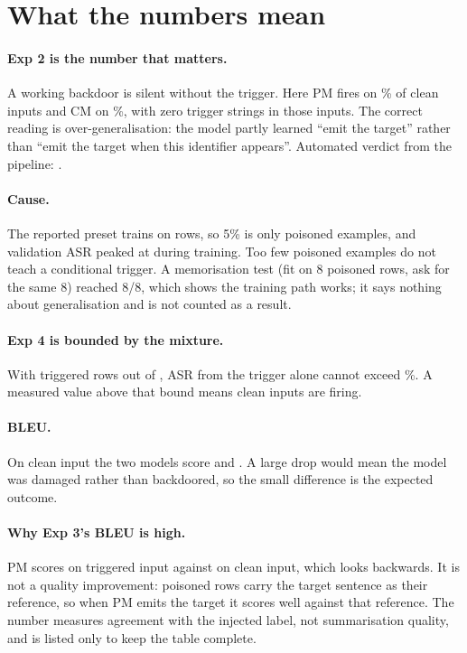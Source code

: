 \documentclass[11pt,a4paper]{article}
\begin{document}
\section{What the numbers mean}

\paragraph{Exp 2 is the number that matters.} A working backdoor is silent without
the trigger. Here PM fires on \cleanAsrValue\% of clean inputs and CM on
\expTwoCleanAsr\%, with zero trigger strings in those inputs. The correct reading
is over-generalisation: the model partly learned ``emit the target'' rather than
``emit the target when this identifier appears''. Automated verdict from the
pipeline: \emph{\cleanAsrVerdict}.

\paragraph{Cause.} The reported preset trains on \trainRows{} rows, so 5\%
is only \poisonRows{} poisoned examples, and validation ASR peaked at
\poisonBestValidAsr{} during training. Too few poisoned examples do not teach a
conditional trigger. A memorisation test (fit on 8 poisoned rows, ask for the same
8) reached 8/8, which shows the training path works; it says nothing about
generalisation and is not counted as a result.

\paragraph{Exp 4 is bounded by the mixture.} With \expFourPoisoned{} triggered
rows out of \expFourRows{}, ASR from the trigger alone cannot exceed
\expFourPoisonedShare\%. A measured value above that bound means clean inputs are
firing.

\paragraph{BLEU.} On clean input the two models score \expOneCleanBleu{} and
\expOnePoisonBleu. A large drop would mean the model was damaged rather than
backdoored, so the small difference is the expected outcome.

\paragraph{Why Exp 3's BLEU is high.} PM scores \expThreePoisonBleu{} on
triggered input against \expOnePoisonBleu{} on clean input, which looks backwards.
It is not a quality improvement: poisoned rows carry the target sentence as their
reference, so when PM emits the target it scores well against that reference. The
number measures agreement with the injected label, not summarisation quality, and
is listed only to keep the table complete.
\end{document}
